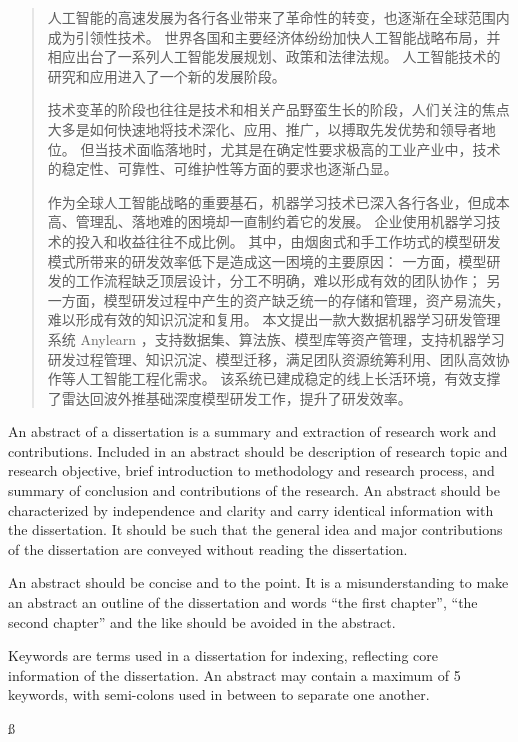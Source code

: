 

\begin{abstract}
  人工智能的高速发展为各行各业带来了革命性的转变，也逐渐在全球范围内成为引领性技术。
  世界各国和主要经济体纷纷加快人工智能战略布局，并相应出台了一系列人工智能发展规划、政策和法律法规。
  人工智能技术的研究和应用进入了一个新的发展阶段。
  
  技术变革的阶段也往往是技术和相关产品野蛮生长的阶段，人们关注的焦点大多是如何快速地将技术深化、应用、推广，以搏取先发优势和领导者地位。
  但当技术面临落地时，尤其是在确定性要求极高的工业产业中，技术的稳定性、可靠性、可维护性等方面的要求也逐渐凸显。

  作为全球人工智能战略的重要基石，机器学习技术已深入各行各业，但成本高、管理乱、落地难的困境却一直制约着它的发展。
  企业使用机器学习技术的投入和收益往往不成比例。
  其中，由烟囱式和手工作坊式的模型研发模式所带来的研发效率低下是造成这一困境的主要原因：
  一方面，模型研发的工作流程缺乏顶层设计，分工不明确，难以形成有效的团队协作；
  另一方面，模型研发过程中产生的资产缺乏统一的存储和管理，资产易流失，难以形成有效的知识沉淀和复用。
  本文提出一款大数据机器学习研发管理系统 Anylearn ，支持数据集、算法族、模型库等资产管理，支持机器学习研发过程管理、知识沉淀、模型迁移，满足团队资源统筹利用、团队高效协作等人工智能工程化需求。
  该系统已建成稳定的线上长活环境，有效支撑了雷达回波外推基础深度模型研发工作，提升了研发效率。

\end{abstract}

\begin{abstract*}
  An abstract of a dissertation is a summary and extraction of research work and contributions.
  Included in an abstract should be description of research topic and research objective, brief introduction to methodology and research process, and summary of conclusion and contributions of the research.
  An abstract should be characterized by independence and clarity and carry identical information with the dissertation.
  It should be such that the general idea and major contributions of the dissertation are conveyed without reading the dissertation.

  An abstract should be concise and to the point.
  It is a misunderstanding to make an abstract an outline of the dissertation and words “the first chapter”, “the second chapter” and the like should be avoided in the abstract.

  Keywords are terms used in a dissertation for indexing, reflecting core information of the dissertation.
  An abstract may contain a maximum of 5 keywords, with semi-colons used in between to separate one another.

\end{abstract*}
ß